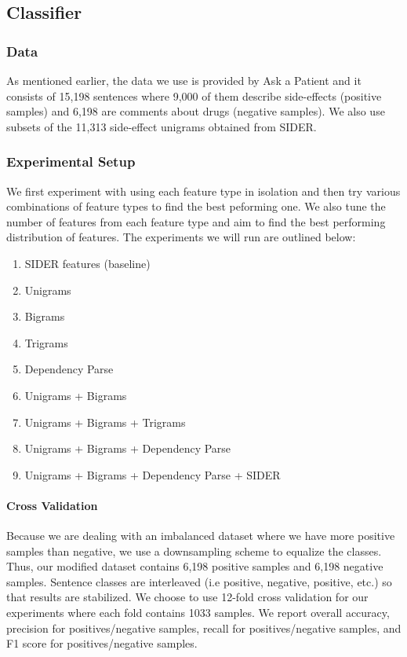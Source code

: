 \documentclass{acm_proc_article-sp}
\begin{document}
\subsection{Classifier}
\vspace{2mm}
\subsubsection{Data}
As mentioned earlier, the data we use is provided by Ask a Patient and it consists of 15,198 sentences where 9,000 of them describe side-effects (positive samples) and 6,198 are comments about drugs (negative samples). We also use subsets of the 11,313 side-effect unigrams obtained from SIDER.

\subsubsection{Experimental Setup}
We first experiment with using each feature type in isolation and then try various combinations of feature types to find the best peforming one. We also tune the number of features from each feature type and aim to find the best performing distribution of features. The experiments we will run are outlined below:
\vspace{-3mm}
\begin{enumerate}
\setlength\itemsep{0.2em}
\item SIDER features (baseline)
\item Unigrams
\item Bigrams
\item Trigrams
\item Dependency Parse 
\item Unigrams + Bigrams
\item Unigrams + Bigrams + Trigrams
\item Unigrams + Bigrams + Dependency Parse
\item Unigrams + Bigrams + Dependency Parse + SIDER
\end{enumerate}

\paragraph{Cross Validation}
Because we are dealing with an imbalanced dataset where we have more positive samples than negative, we use a downsampling scheme to equalize the classes. Thus, our modified dataset contains 6,198 positive samples and 6,198 negative samples. Sentence classes are interleaved (i.e positive, negative, positive, etc.) so that results are stabilized. We choose to use 12-fold cross validation for our experiments where each fold contains 1033 samples.
We report overall accuracy, precision for positives/negative samples, recall for positives/negative samples, and F1 score for positives/negative samples. 
\end{document}
